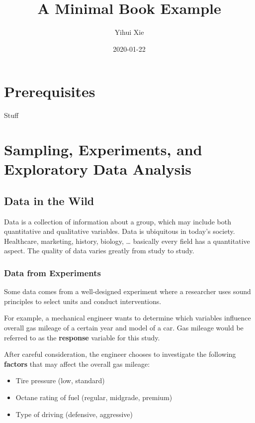 \documentclass[]{book}
\title{A Minimal Book Example}
\author{Yihui Xie}
\date{2020-01-22}
\providecommand{\tightlist}{%
  \setlength{\itemsep}{0pt}\setlength{\parskip}{0pt}}
\theoremstyle{definition}
\theoremstyle{definition}
\theoremstyle{definition}
\theoremstyle{remark}
\begin{document}
\maketitle

{
\setcounter{tocdepth}{1}
\tableofcontents
}
\chapter{Prerequisites}\label{prerequisites}

Stuff

\chapter{Sampling, Experiments, and Exploratory Data
Analysis}\label{sampling-experiments-and-exploratory-data-analysis}

\section{Data in the Wild}\label{data-in-the-wild}

Data is a collection of information about a group, which may include
both quantitative and qualitative variables. Data is ubiquitous in
today's society. Healthcare, marketing, history, biology, \ldots{}
basically every field has a quantitative aspect. The quality of data
varies greatly from study to study.

\subsection{Data from Experiments}\label{data-from-experiments}

Some data comes from a well-designed experiment where a researcher uses
sound principles to select units and conduct interventions.

For example, a mechanical engineer wants to determine which variables
influence overall gas mileage of a certain year and model of a car. Gas
mileage would be referred to as the \textbf{response} variable for this
study.

After careful consideration, the engineer chooses to investigate the
following \textbf{factors} that may affect the overall gas mileage:

\begin{itemize}
\tightlist
\item
  Tire pressure (low, standard)\\
\item
  Octane rating of fuel (regular, midgrade, premium)\\
\item
  Type of driving (defensive, aggressive)
\end{itemize}
\end{document}
